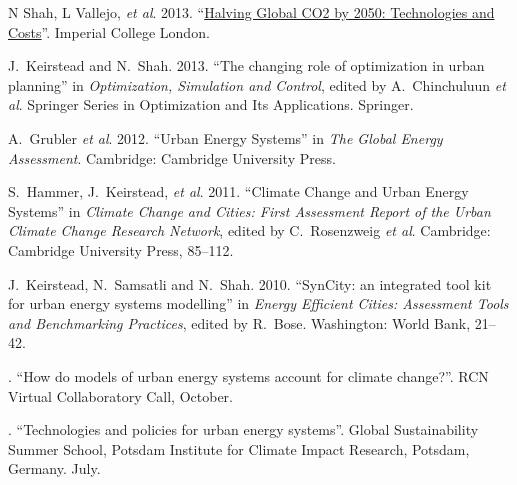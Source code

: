 \documentclass[11pt,a4paper]{article}
\begin{document}
\ind N Shah, L Vallejo, \emph{et al}. 2013. ``\href{http://www3.imperial.ac.uk/climatechange/publications/collaborative/halving-global-co2-by-2050}{Halving Global CO2 by 2050: Technologies and Costs}''.  Imperial College London.

\ind J.\ Keirstead and N.\ Shah. 2013. ``The changing role of optimization in urban planning'' in \emph{Optimization, Simulation and Control}, edited by A.\ Chinchuluun \emph{et al}.  Springer Series in Optimization and Its Applications.  Springer.

\ind A.\ Grubler \emph{et al}. 2012. ``Urban Energy Systems'' in \emph{The Global Energy Assessment}. Cambridge: Cambridge University Press.

\ind S.\ Hammer, J.\ Keirstead, \emph{et al}. 2011. ``Climate Change and Urban Energy Systems'' in \emph{Climate Change and Cities: First Assessment Report of the Urban Climate Change Research Network}, edited by C.\ Rosenzweig \emph{et al}.  Cambridge: Cambridge University Press, 85--112.

\ind J.\ Keirstead, N.\ Samsatli and N.\ Shah. 2010. ``SynCity: an integrated tool kit for urban energy systems modelling'' in \emph{Energy Efficient Cities: Assessment Tools and Benchmarking Practices}, edited by R.\ Bose.  Washington: World Bank, 21--42.


\bigskip 

 



\noindent{}%
%
. ``How do models of urban energy systems account for climate change?''. RCN Virtual Collaboratory Call, October.

. ``Technologies and policies for urban energy systems''.  Global Sustainability Summer School, Potsdam Institute for Climate Impact Research, Potsdam, Germany. July.
\end{document}
